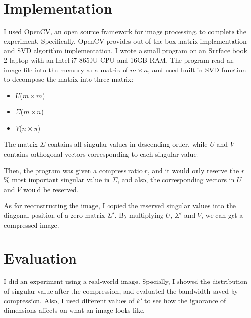 \documentclass{article}
\begin{document}
    \section{Implementation}
        \par
        I used OpenCV, an open source framework for image processing, to complete the experiment.
        Specifically, OpenCV provides out-of-the-box matrix implementation
        and SVD algorithm implementation.
        I wrote a small program on an Surface book 2 laptop with an Intel i7-8650U CPU and 16GB RAM.
        The program read an image file into the memory as a matrix of $m \times n$,
        and used built-in SVD function to decompose the matrix into three matrix:
        \begin{itemize}
            \item $U$($m \times m$)
            \item $\Sigma$($m \times n$)
            \item $V$($n \times n$)
        \end{itemize}
        The matrix $\Sigma$ contains all singular values in descending order,
        while $U$ and $V$ contains orthogonal vectors corresponding to each singular value.
        \par
        Then, the program was given a compress ratio $r$,
        and it would only reserve the $r$\% most important singular value in $\Sigma$,
        and also, the corresponding vectors in $U$ and $V$ would be reserved.
        \par
        As for reconstructing the image,
        I copied the reserved singular values into the diagonal position of a zero-matrix $\Sigma'$.
        By multiplying $U$, $\Sigma'$ and $V$, we can get a compressed image.

    \section{Evaluation}
        \par
        I did an experiment using a real-world image.
        Specially, I showed the distribution of singular value after the compression,
        and evaluated the bandwidth saved by compression.
        Also, I used different values of $k'$ to see
        how the ignorance of dimensions affects on what an image looks like.
\end{document}
